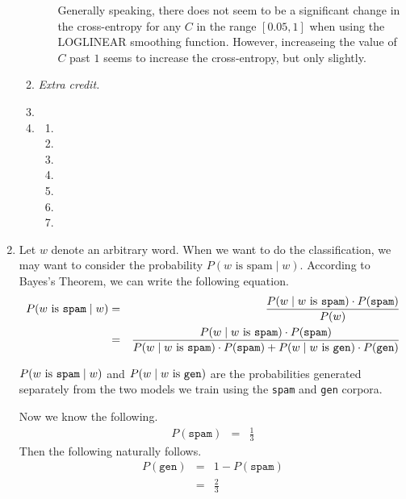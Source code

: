 \documentclass[11pt]{article}
\begin{document}
\begin{enumerate}
\begin{enumerate}[label=(\alph*)]
\begin{itemize}
			Generally speaking, there does not seem to be a significant change in the cross-entropy for any $C$ in the range $[0.05, 1]$ when using the LOGLINEAR smoothing function. However, increaseing the value of $C$ past $1$ seems to increase the cross-entropy, but only slightly.
			\vspace{8pt} \\

		\end{itemize}


	\item %
		\textit{Extra credit.}
	\item %
	\item %
		\begin{enumerate}[label=\roman*.]
		\item %
		\item %
		\item %
		\item %
		\item %
		\item %
		\item %
		\end{enumerate}
	\end{enumerate}
\item %
	Let $w$ denote an arbitrary word. When we want to do the classification, we may want to consider the probability $P(w \text{ is spam} \mid w)$. According to Bayes's Theorem, we can write the following equation.
	\begin{eqnarray*}
		P(w \text{ is \texttt{spam}} \mid w) &=& \frac{P(w \mid w \text{ is \texttt{spam}}) \cdot P(\texttt{spam})}{P(w)} \\
	               &=& \frac{P(w \mid w \text{ is \texttt{spam}}) \cdot P(\texttt{spam})}{P(w \mid w \text{ is \texttt{spam}}) \cdot P(\texttt{spam}) + P(w \mid w \text{ is \texttt{gen}}) \cdot P(\texttt{gen})}
	\end{eqnarray*}

	$P(w \text{ is \texttt{spam}} \mid w)$ and $P(w \mid w \text{ is \texttt{gen}})$ are the probabilities generated separately from the two models we train using the \texttt{spam} and \texttt{gen} corpora.

	Now we know the following.
	\begin{eqnarray*}
		P(\texttt{spam}) &=& \frac{1}{3}
	\end{eqnarray*}
	Then the following naturally follows. 
	\begin{eqnarray*}
		P(\texttt{gen}) &=& 1 - P(\texttt{spam}) \\
			&=& \frac{2}{3}
	\end{eqnarray*}


\end{enumerate}
\end{document}
